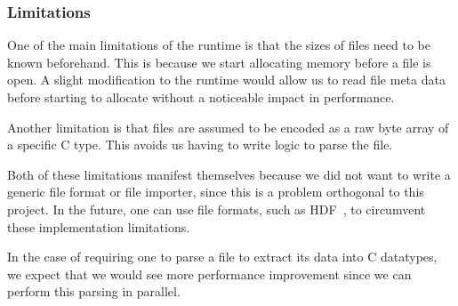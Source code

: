 
\subsubsection{Limitations}

One of the main limitations of the runtime is that the sizes of files need to
	be known beforehand.
This is because we start allocating memory before a file is open.
A slight modification to the runtime would allow us to read file meta data 
	before starting to allocate without a noticeable impact in performance.

Another limitation is that files are assumed to be encoded as a raw byte
	array of a specific C type.
This avoids us having to write logic to parse the file.

Both of these limitations manifest themselves because we did not want to 
	write a generic file format or file importer, since this is a problem 
	orthogonal to this project.
In the future, one can use file formats,
	such as HDF~\cite{folk2011overview}, to circumvent these implementation
	limitations.

In the case of requiring one to parse a file to extract its data into
	C datatypes, we expect that we would see more performance
	improvement since we can perform this parsing in parallel.

